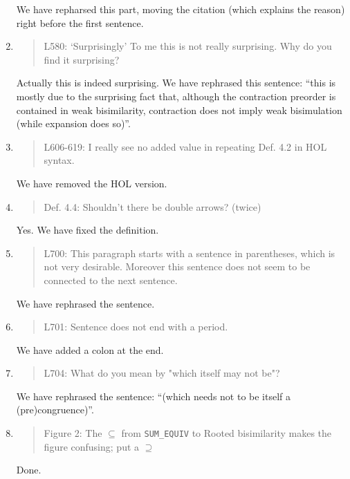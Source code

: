 \begin{enumerate}
  We have repharsed this part, moving the citation
  \cite{sangiorgi1992problem} (which explains the reason) right before
  the first sentence.
  
\item \begin{quote}
    L580: ‘Surprisingly’ To me this is not really surprising. Why do you find it surprising?
  \end{quote}
  Actually this is indeed surprising. We have rephrased this sentence:
  ``this is mostly due to the surprising fact
  that, although the contraction preorder is contained in weak
bisimilarity, contraction does not imply weak bisimulation (while
expansion does so)''.

\item \begin{quote}
    L606-619: I really see no added value in repeating Def. 4.2 in HOL syntax.
  \end{quote}
  We have removed the HOL version.
  
\item \begin{quote}
    Def. 4.4: Shouldn’t there be double arrows? (twice)
  \end{quote}
  Yes. We have fixed the definition.
  
\item \begin{quote}
    L700: This paragraph starts with a sentence in parentheses, which is not very desirable.
    Moreover this sentence does not seem to be connected to the next sentence.
  \end{quote}
  We have rephrased the sentence.
  
\item \begin{quote}
    L701: Sentence does not end with a period.
  \end{quote}
  We have added a colon at the end.
  
\item \begin{quote}
    L704: What do you mean by "which itself may not be"?
  \end{quote}
  We have rephrased the sentence: ``(which needs not to be itself a (pre)congruence)''.

\item \begin{quote}
    Figure 2: The $\subseteq$ from \texttt{SUM\_EQUIV} to Rooted
    bisimilarity makes the figure confusing; put a $\supseteq$
  \end{quote}
  Done.
  

\end{enumerate}
